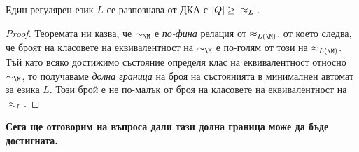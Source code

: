 \begin{cor}
  Един регулярен език $L$ се разпознава от ДКА с $\vert{Q}\vert \geq \vert{\approx_L}\vert$.
\end{cor}
\begin{proof}
  Теоремата ни казва, че $\sim_\M$ е {\em по-фина} релация от $\approx_{L(\M)}$, от което следва, че
  броят на класовете на еквивалентност на $\sim_\M$ е по-голям от този на $\approx_{L(\M)}$.
  Тъй като всяко достижимо състояние определя клас на еквивалентност относно $\sim_\M$,
  то получаваме {\em долна граница} на броя на състоянията в минималнен автомат за езика $L$.
  Този брой е не по-малък от броя на класовете на еквивалентност на $\approx_L$.
  
\end{proof}

{\bf Сега ще отговорим на въпроса дали тази долна граница може да бъде достигната.}

